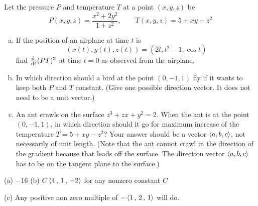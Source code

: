 \begin{question}[M200 2014A] %
Let the pressure $P$ and temperature $T$ at a point $(x, y, z)$ be
\begin{equation*}
P(x,y,z) = \frac{x^2+2y^2}{1+z^2},\qquad
T(x,y,z) = 5 + xy - z^2
\end{equation*}
\begin{enumerate}[(a)]
\item
If the position of an airplane at time $t$ is
\begin{equation*}
(x(t), y(t), z(t)) = (2t, t^2 - 1, \cos t)
\end{equation*}
find $\diff{}{t} (PT)^2$ at time $t = 0$ as observed from the airplane.

\item
In which direction should a bird at the point $(0,-1,1)$ fly if it 
wants to keep both $P$ and $T$ constant. (Give one possible direction 
vector. It does not need to be a unit vector.)

\item
An ant crawls on the surface $z^3 + zx + y^2 = 2$. 
When the ant is at the point $(0,-1,1)$, in which direction should it 
go for maximum increase of the temperature $T = 5 + xy - z^2$?
Your answer should be a vector $\left< a, b, c\right>$, not necessarily 
of unit length. (Note that the ant cannot crawl in the direction of 
the gradient because that leads off the surface. The direction vector 
$\left< a, b, c\right>$ has to be on the tangent plane to the surface.)
\end{enumerate}
\end{question}

%

\begin{answer}
(a) $-16$\qquad
(b) $C \left<  4\,,\,  1 \,,\, -2\right>$ for any nonzero constant $C$

(c) Any positive non zero multiple of $-\left< 1\,,\, 2\,,\,1\right>$ will do.
\end{answer}

